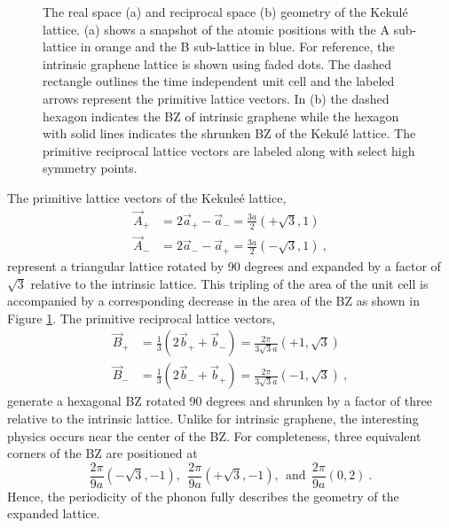 \begin{figure}
	\begin{center}
	
	\end{center}
	\caption[The geometry of the Kekul\'e lattice]{\label{fig:kek:geometry}
		The real space (a) and reciprocal space (b) geometry of the Kekul\'e lattice.
		(a) shows a snapshot of the atomic positions with the A sub-lattice in orange and the B sub-lattice in blue.	
		For reference, the intrinsic graphene lattice is shown using faded dots.
		The dashed rectangle outlines the time independent unit cell and the labeled arrows represent the primitive lattice vectors.
		In (b) the dashed hexagon indicates the BZ of intrinsic graphene while the hexagon with solid lines indicates the shrunken BZ of the Kekul\'e lattice.
		The primitive reciprocal lattice vectors are labeled along with select high symmetry points.
	}
\end{figure}

The primitive lattice vectors of the Kekule\'e lattice,
\begin{align*}
	\vec{A}_+&=2 \vec{a}_+-\vec{a}_-=\frac{3 a}{2} (+\sqrt{3},1) \\
	\vec{A}_-&=2 \vec{a}_--\vec{a}_+=\frac{3 a}{2} (-\sqrt{3},1) \ ,
\end{align*}
represent a triangular lattice rotated by 90 degrees and expanded by a factor of $\sqrt{3}$ relative to the intrinsic lattice.
This tripling of the area of the unit cell is accompanied by a corresponding decrease in the area of the BZ as shown in Figure \ref{fig:kek:geometry}.
The primitive reciprocal lattice vectors,
\begin{align*}
	\vec{B}_+&=\frac{1}{3} (2\vec{b}_+ + \vec{b}_-)=\frac{2 \pi}{3 \sqrt{3} a}(+1,\sqrt{3}) \\
	\vec{B}_-&=\frac{1}{3} (2\vec{b}_- + \vec{b}_+)=\frac{2 \pi}{3 \sqrt{3} a}(-1,\sqrt{3}) \ ,
\end{align*}
generate a hexagonal BZ rotated 90 degrees and shrunken by a factor of three relative to the intrinsic lattice.
Unlike for intrinsic graphene, the interesting physics occurs near the center of the BZ.
For completeness, three equivalent corners of the BZ are positioned at
\begin{equation*}
	\frac{2 \pi}{9 a} (-\sqrt{3},-1), \ \ \frac{2 \pi}{9 a} (+\sqrt{3},-1), \ \ \textrm{and} \ \  \frac{2 \pi}{9 a} (0,2) \ .
\end{equation*}
Hence, the periodicity of the phonon fully describes the geometry of the expanded lattice.

